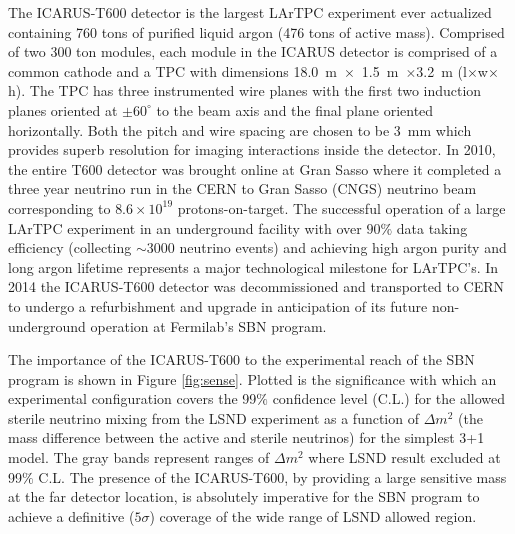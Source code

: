 \label{sec:IF_ICARUS}
The ICARUS-T600 detector is the largest LArTPC experiment ever actualized containing 760 tons of purified liquid argon (476 tons of active mass). Comprised of two 300 ton modules, each module in the ICARUS detector is comprised of a common cathode and a TPC with dimensions 18.0~m~$\times$~1.5~m~$\times$3.2~m (l$\times$w$\times$h). The TPC has three instrumented wire planes with the first two induction planes oriented at $\pm 60^{\circ}$ to the beam axis and the final plane oriented horizontally. Both the pitch and wire spacing are chosen to be 3~mm which provides superb resolution for imaging interactions inside the detector. In 2010, the entire T600 detector was brought online at Gran Sasso where it completed a three year neutrino run in the CERN to Gran Sasso (CNGS) neutrino beam corresponding to $8.6 \times 10^{19}$ protons-on-target. The successful operation of a large LArTPC experiment in an underground facility with over $90\%$ data taking efficiency (collecting $\sim$3000 neutrino events) and achieving high argon purity and long argon lifetime represents a major technological milestone for LArTPC's. In 2014 the ICARUS-T600 detector was decommissioned and transported to CERN to undergo a refurbishment and upgrade in anticipation of its future non-underground operation at Fermilab's SBN program. 


The importance of the ICARUS-T600 to the experimental reach of the SBN program is shown in Figure \ref{fig:sense}. Plotted is the significance with which an experimental configuration covers the 99$\%$ confidence level (C.L.) for the allowed sterile neutrino mixing from the LSND experiment as a function of $\Delta m^{2}$ (the mass difference between the active and sterile neutrinos) for the simplest 3+1 model. The gray bands represent ranges of $\Delta m^{2}$ where LSND result excluded at 99$\%$ C.L. The presence of the ICARUS-T600, by providing a large sensitive mass at the far detector location, is absolutely imperative for the SBN program to achieve a definitive ($5\sigma$) coverage of the wide range of LSND allowed region.

